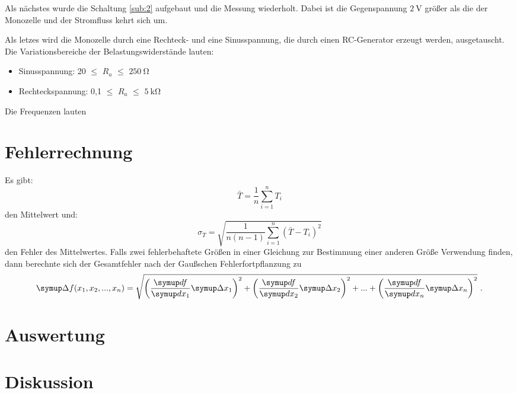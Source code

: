 Als nächstes wurde die Schaltung \ref{sub:2} aufgebaut und die Messung wiederholt.
Dabei ist die Gegenspannung $\SI{2}{\volt}$ größer als die der Monozelle und der
Stromfluss kehrt sich um.

Als letzes wird die Monozelle durch eine Rechteck- und eine Sinusspannung, die
durch einen RC-Generator erzeugt werden, ausgetauscht. Die Variationsbereiche der
Belastungswiderstände lauten:
\begin{itemize}
  \item Sinusspannung: 20 $\leq$ $R_a$ $\le$ $\SI{250}{\ohm}$
  \item Rechteckspannung: 0,1 $\leq$ $R_a$ $\leq$ $\SI{5}{\kilo\ohm}$
\end{itemize}
Die Frequenzen lauten %
 \section{Fehlerrechnung}
 Es gibt:
 \begin{equation}
   \bar{T} = \frac{1}{n} \sum_{i=1}^{n} T_{i}
   \label{eqn:1}
 \end{equation}
 den Mittelwert und:
 \begin{equation}
   \sigma_{\bar{T}} = \sqrt{\frac{1}{n(n-1)} \sum_{i=1}^{n}(\bar{T}-T_i)^2}
   \label{eqn:2}
 \end{equation}
 den Fehler des Mittelwertes. Falls zwei fehlerbehaftete Größen in einer Gleichung
 zur Bestimmung einer anderen Größe Verwendung finden, dann berechnte sich der Gesamtfehler
 nach der Gaußschen Fehlerfortpflanzung zu
 \begin{equation}
     \symup \Delta f(x_1, x_2, ..., x_n) = \sqrt{\left(\frac{\symup df}{\symup dx_1} \symup \Delta
     x_1 \right)^2 +    \left(\frac{\symup df}{\symup dx_2} \symup \Delta
     x_2 \right)^2 + ... + \left(\frac{\symup df}{\symup dx_n} \symup \Delta x_n \right)^2} \ .
     \label{eqn:3}
 \end{equation}

\section{Auswertung}

\section{Diskussion}

\newpage
\nocite{*}
\printbibliography
